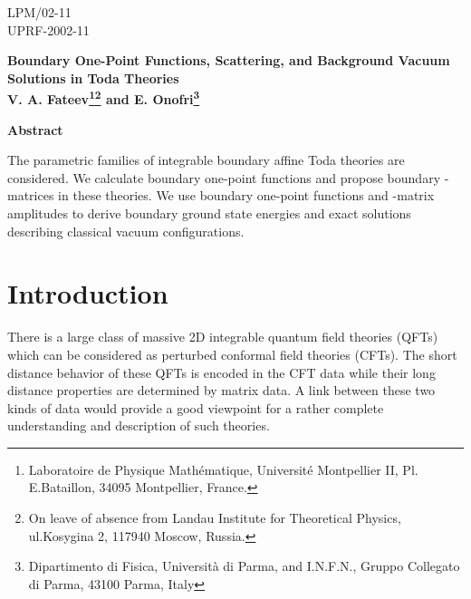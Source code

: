 \documentclass[a4paper,12pt,titlepage,final]{article}
\begin{document}
  \begin{titlepage}
    \begin{flushright}
{\small\sf LPM/02-11\\
      UPRF-2002-11}
    \end{flushright}
    \begin{center}
\textbf{\Large Boundary One-Point Functions, Scattering, and
Background Vacuum Solutions in Toda Theories}\\[2.em] \textbf{\large
V. A. Fateev\footnote{Laboratoire de Physique Math\'{e}matique,
Universit\'{e} Montpellier II, Pl. E.Bataillon, 34095 Montpellier,
France.}\myHighlight{$^,$}\coordHE{}\footnote{On leave of absence from Landau Institute for
Theoretical Physics, ul.Kosygina 2, 117940 Moscow, Russia.}
\hspace{0.2cm} and E. Onofri\footnote{Dipartimento di Fisica,
Universit\`a di
Parma, and {\small\sf I.N.F.N.}, Gruppo Collegato di Parma, 43100 Parma,
Italy}
}\\[5.em]
\end{center}

\date{}


\bigskip
\bigskip

\begin{center}
\textbf{Abstract}
\end{center}
\bigskip
The parametric families of integrable boundary affine Toda theories are
considered. We calculate boundary one-point functions and propose boundary
\coordHE{}-matrices in these theories. We use boundary one-point functions and
\coordHE{}-matrix amplitudes to derive boundary ground state energies and exact
solutions describing classical vacuum configurations.

 \end{titlepage}

\section{ Introduction}

There is a large class of massive 2D integrable quantum field theories
(QFTs) which can be considered as perturbed conformal field theories (CFTs).
The short distance behavior of these QFTs is encoded in the CFT data while
their long distance properties are determined by \coordHE{}matrix data. A link
between these two kinds of data would provide a good viewpoint for a rather
complete understanding and description of such theories.
\end{document}
